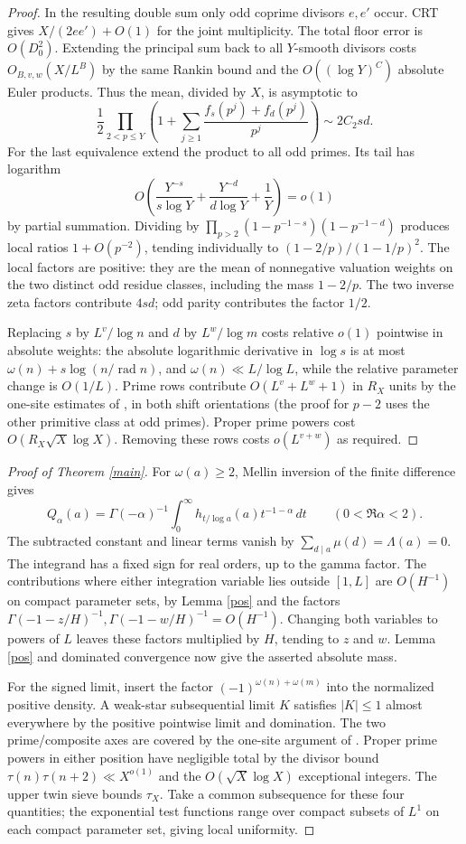 \documentclass[11pt]{article}
\newcommand{\rad}{\operatorname{rad}}
\begin{document}
\begin{proof}
In the resulting double sum only odd coprime divisors $e,e'$
occur. CRT gives $X/(2ee')+O(1)$ for the joint multiplicity.
The total floor error is $O(D_0^2)$. Extending the principal sum
back to all $Y$-smooth divisors costs $O_{B,v,w}(X/L^B)$ by the
same Rankin bound and the $O((\log Y)^C)$ absolute Euler products.
Thus the mean, divided by $X$, is asymptotic to
\[
 \frac12\prod_{2<p\le Y}
 \left(1+\sum_{j\ge1}\frac{f_s(p^j)+f_d(p^j)}{p^j}\right)
 \sim 2 C_2 s d .
\]
For the last equivalence extend the product to all odd primes. Its
tail has logarithm
\[ O\left(\frac{Y^{-s}}{s\log Y}+\frac{Y^{-d}}{d\log Y}+\frac1Y\right)=o(1) \]
by partial summation. Dividing by
$\prod_{p>2}(1-p^{-1-s})(1-p^{-1-d})$ produces local ratios
$1+O(p^{-2})$, tending individually to $(1-2/p)/(1-1/p)^2$.
The local factors are positive: they are the mean of nonnegative
valuation weights on the two distinct odd residue classes, including
the mass $1-2/p$. The two inverse zeta factors contribute $4sd$;
odd parity contributes the factor $1/2$.

Replacing $s$ by $L^v/\log n$ and $d$ by $L^w/\log m$ costs relative
$o(1)$ pointwise in absolute weights: the absolute logarithmic
derivative in $\log s$ is at most $\omega(n)+s\log(n/\rad n)$,
and $\omega(n)\ll L/\log L$, while the relative parameter change is
$O(1/L)$. Prime rows contribute $O(L^v+L^w+1)$ in $R_X$ units by
the one-site estimates of \cite{OneSite}, in both shift orientations
(the proof for $p-2$ uses the other primitive class at odd primes).
Proper prime powers cost $O(R_X\sqrt X\log X)$. Removing these
rows costs $o(L^{v+w})$ as required.
\end{proof}

\begin{proof}[Proof of Theorem \ref{main}]
For $\omega(a)\ge2$, Mellin inversion of the finite difference gives
\[
 Q_\alpha(a)=\Gamma(-\alpha)^{-1}\int_0^\infty
                 h_{t/\log a}(a)t^{-1-\alpha}\,dt
 \qquad (0<\Re\alpha<2).
\]
The subtracted constant and linear terms vanish by
$\sum_{d\mid a}\mu(d)=\Lambda(a)=0$. The integrand has a fixed sign
for real orders, up to the gamma factor. The contributions where
either integration variable lies outside $[1,L]$ are $O(H^{-1})$
on compact parameter sets, by Lemma \ref{pos} and the factors
$\Gamma(-1-z/H)^{-1},\Gamma(-1-w/H)^{-1}=O(H^{-1})$.
Changing both variables to powers of $L$ leaves these factors
multiplied by $H$, tending to $z$ and $w$. Lemma \ref{pos} and
dominated convergence now give the asserted absolute mass.

For the signed limit, insert the factor
$(-1)^{\omega(n)+\omega(m)}$ into the normalized positive density.
A weak-star subsequential limit $K$ satisfies $|K|\le1$
almost everywhere by the positive pointwise limit and domination.
The two prime/composite axes are covered by the one-site argument
of \cite{OneSite}. Proper prime powers in either position have
negligible total by the divisor bound $\tau(n)\tau(n+2)\ll X^{o(1)}$
and the $O(\sqrt X\log X)$ exceptional integers. The upper twin sieve
bounds $\tau_X$. Take a common subsequence for these four quantities;
the exponential test functions range over compact subsets of $L^1$
on each compact parameter set, giving local uniformity.
\end{proof}
\end{document}
